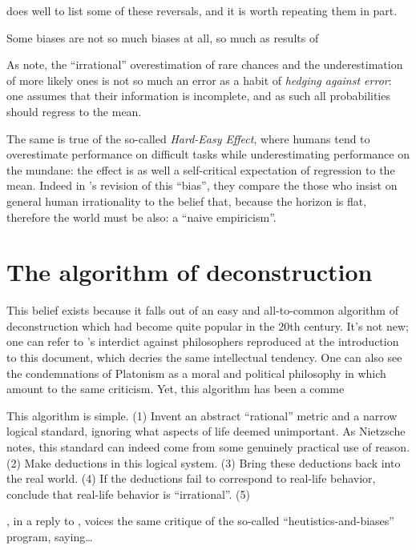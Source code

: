 \documentclass{article}
\begin{document}
\textcite[14--15]{gigerenzer08} does well to list some of these reversals,  and it is worth repeating them in part.



Some biases are not so much biases at all, so much as results of 



As \textcite{hertig05} note, the ``irrational'' overestimation of rare chances and the underestimation of more likely ones is not so much an error as a habit of \emph{hedging against error}: one assumes that their information is incomplete, and as such all probabilities should regress to the mean.

The same is true of the so-called \textit{Hard-Easy Effect}, where humans tend to overestimate performance on difficult tasks while underestimating performance on the mundane: the effect is as well a self-critical expectation of regression to the mean.
Indeed in \textcite{juslin00}'s revision of this ``bias'', they compare the those who insist on general human irrationality to the belief that, because the horizon is flat, therefore the world must be also: a ``naive empiricism''.


\section{The algorithm of deconstruction}

This belief exists because it falls out of an easy and all-to-common algorithm of deconstruction which had become quite popular in the 20th century.
It's not new; one can refer to \textcite{nietzsche88}'s interdict against philosophers reproduced at the introduction to this document, which decries the same intellectual tendency.
One can also see the condemnations of Platonism as a moral and political philosophy in \textcite{popper45} which amount to the same criticism.
Yet, this algorithm has been a comme

This algorithm is simple.
(1) Invent an abstract ``rational'' metric and a narrow logical standard, ignoring what aspects of life deemed unimportant. As Nietzsche notes, this standard can indeed come from some genuinely practical use of reason.
(2) Make deductions in this logical system.
(3) Bring these deductions back into the real world.
(4) If the deductions fail to correspond to real-life behavior, conclude that real-life behavior is ``irrational''.
(5) 


\textcite{gigerenzer96}, in a reply to \textcite{kahneman96}, voices the same critique of the so-called ``heutistics-and-biases'' program, saying\ldots
\end{document}
